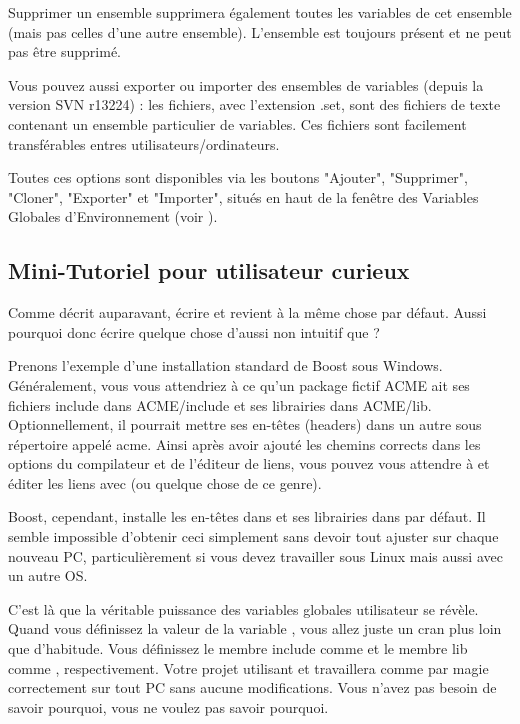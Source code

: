 Supprimer un ensemble supprimera également toutes les variables de cet ensemble (mais pas celles d'une autre ensemble). L'ensemble  est toujours présent et ne peut pas être supprimé.

Vous pouvez aussi exporter ou importer des ensembles de variables (depuis la version SVN r13224) : les fichiers, avec l'extension .set, sont des fichiers de texte contenant un ensemble particulier de variables. Ces fichiers sont facilement transférables entres utilisateurs/ordinateurs.

Toutes ces options sont disponibles via les boutons "Ajouter", "Supprimer", "Cloner", "Exporter" et "Importer", situés en haut de la fenêtre des Variables Globales d'Environnement (voir ).

\subsection{Mini-Tutoriel pour utilisateur curieux}\label{sec:mini_tutorial}

Comme décrit auparavant, écrire  et  revient à la même chose par défaut. Aussi pourquoi donc écrire quelque chose d'aussi non intuitif que ?

Prenons l'exemple d'une installation standard de Boost sous Windows. Généralement, vous vous attendriez à ce qu'un package fictif ACME ait ses fichiers include dans ACME/include et ses librairies dans ACME/lib. Optionnellement, il pourrait mettre ses en-têtes (headers) dans un autre sous répertoire appelé acme. Ainsi après avoir ajouté les chemins corrects dans les options du compilateur et de l'éditeur de liens, vous pouvez vous attendre à  et éditer les liens avec  (ou quelque chose de ce genre).

Boost, cependant, installe les en-têtes dans  et ses librairies dans  par défaut. Il semble impossible d'obtenir ceci simplement sans devoir tout ajuster sur chaque nouveau PC, particulièrement si vous devez travailler sous Linux mais aussi avec un autre OS.

C'est là que la véritable puissance des variables globales utilisateur se révèle. Quand vous définissez la valeur de la variable , vous allez juste un cran plus loin que d'habitude. Vous définissez le membre include comme  et le membre lib comme , respectivement. Votre projet utilisant  et  travaillera comme par magie correctement sur tout PC sans aucune modifications. Vous n'avez pas besoin de savoir pourquoi, vous ne voulez pas savoir pourquoi.


